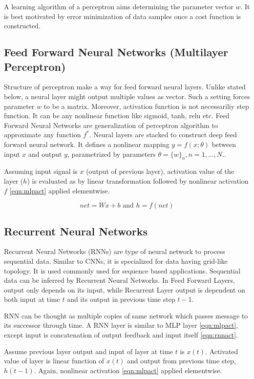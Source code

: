 A learning algorithm of a perceptron aims determining the parameter vector $w$. It is best motivated by error minimization of data samples once a cost function is constructed.

\subsection{Feed Forward Neural Networks (Multilayer Perceptron)}
Structure of perceptron make a way for feed forward neural layers. Unlike stated below, a neural layer might output multiple values as vector. Such a setting forces parameter $w$ to be a matrix. Moreover, activation function is not necessariliy step function. It can be any nonlinear function like sigmoid, tanh, relu etc. Feed Forward Neural Networks are generalization of perceptron algorithm to approximate any function $f^*$. Neural layers are stacked to construct deep feed forward neural network. It defines a nonlinear mapping $y=f(x;\theta)$ between input $x$ and output $y$, parametrized by parameters $\theta = \{w\}_n,n=1,…,N.$.

Assuming input signal is $x$ (output of previous layer), activation value of the layer ($h$) is evaluated as by linear transformation followed by nonlinear activation $f$ \ref{eqn:mlpact} applied elementwise.

\begin{equation}
\label{eqn:mlpact}
net = W x + b \text{ and } h = f(net)
\end{equation}

\subsection{Recurrent Neural Networks}
Recurrent Neural Networks (RNNs) \cite{rumelhart_learning_1986} are type of neural network to process sequential data. Similar to CNNs, it is specialized for data having grid-like topology. It is used commonly used for sequence based applications.
Sequential data can be inferred by Recurrent Neural Networks. In Feed Forward Layers, output only depends on its input, while Recurrent Layer output is dependent on both input at time $t$ and its output in previous time step $t-1$.

RNN can be thought as multiple copies of same network which passes message to its successor through time. A RNN layer is similar to MLP layer \ref{eqn:mlpact}, except input is concatenation of output feedback and input itself \ref{eqn:rnnact}.

Assume previous layer output and input of layer at time $t$ is $x(t)$. Activated value of layer is linear function of $x(t)$ and output from previous time step, $h(t-1)$. Again, nonlinear activation \ref{eqn:mlpact} applied elementwise. 

